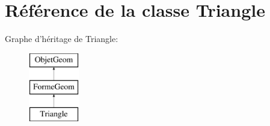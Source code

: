 \hypertarget{class_triangle}{\section{Référence de la classe Triangle}
\label{class_triangle}
}
Graphe d'héritage de Triangle\+:\begin{figure}[H]
\begin{center}
\leavevmode
\includegraphics[height=3.000000cm]{class_triangle}
\end{center}
\end{figure}
